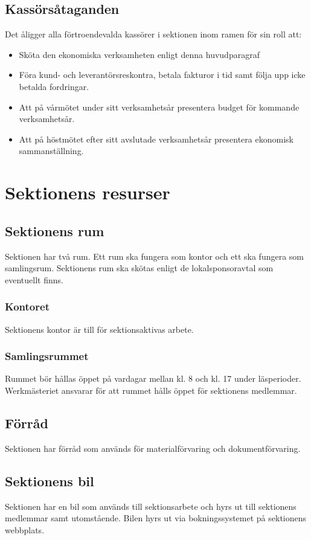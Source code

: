 \documentclass{datateknologsektionen-document}
\begin{document}
\subsection{Kassörsåtaganden}
\label{kassorsataganden}
Det åligger alla förtroendevalda kassörer i sektionen inom ramen för sin roll att:
\begin{itemize}
  \item Sköta den ekonomiska verksamheten enligt denna huvudparagraf
  \item Föra kund- och leverantörsreskontra, betala fakturor i tid samt följa upp icke betalda fordringar.
  \item Att på vårmötet under sitt verksamhetsår presentera budget för kommande verksamhetsår.
  \item Att på höstmötet efter sitt avslutade verksamhetsår presentera ekonomisk sammanställning.
\end{itemize}

\section{Sektionens resurser}
\subsection{Sektionens rum}
Sektionen har två rum. Ett rum ska fungera som kontor och ett ska fungera som samlingsrum.
Sektionens rum ska skötas enligt de lokalsponsoravtal som eventuellt finns.

\subsubsection{Kontoret}
Sektionens kontor är till för sektionsaktivas arbete.

\subsubsection{Samlingsrummet}
Rummet bör hållas öppet på vardagar mellan kl. 8 och kl. 17 under läsperioder.
Werkmästeriet ansvarar för att rummet hålls öppet för sektionens medlemmar.

\subsection{Förråd}
Sektionen har förråd som används för materialförvaring och dokumentförvaring.

\subsection{Sektionens bil}
Sektionen har en bil som används till sektionsarbete och hyrs ut till sektionens medlemmar samt
utomstående. Bilen hyrs ut via bokningssystemet på sektionens webbplats.
\end{document}
